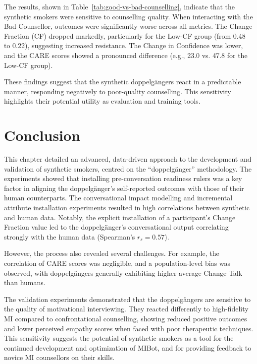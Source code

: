 The results, shown in Table~\ref{tab:good-vs-bad-counselling}, indicate that the synthetic smokers were sensitive to counselling quality. When interacting with the Bad Counsellor, outcomes were significantly worse across all metrics. The Change Fraction (CF) dropped markedly, particularly for the Low-CF group (from 0.48 to 0.22), suggesting increased resistance. The Change in Confidence was lower, and the CARE scores showed a pronounced difference (e.g., 23.0 vs. 47.8 for the Low-CF group).

These findings suggest that the synthetic doppelgängers react in a predictable manner, responding negatively to poor-quality counselling. This sensitivity highlights their potential utility as evaluation and training tools.

\section{Conclusion}

This chapter detailed an advanced, data-driven approach to the development and validation of synthetic smokers, centred on the ``doppelgänger'' methodology. The experiments showed that installing pre-conversation readiness rulers was a key factor in aligning the doppelgänger’s self-reported outcomes with those of their human counterparts. The conversational impact modelling and incremental attribute installation experiments resulted in high correlations between synthetic and human data. Notably, the explicit installation of a participant's Change Fraction value led to the doppelgänger's conversational output correlating strongly with the human data (Spearman’s $r_s = 0.57$).

However, the process also revealed several challenges. For example, the correlation of CARE scores was negligible, and a population-level bias was observed, with doppelgängers generally exhibiting higher average Change Talk than humans.

The validation experiments demonstrated that the doppelgängers are sensitive to the quality of motivational interviewing. They reacted differently to high-fidelity MI compared to confrontational counselling, showing reduced positive outcomes and lower perceived empathy scores when faced with poor therapeutic techniques. This sensitivity suggests the potential of synthetic smokers as a tool for the continued development and optimization of MIBot, and for providing feedback to novice MI counsellors on their skills.